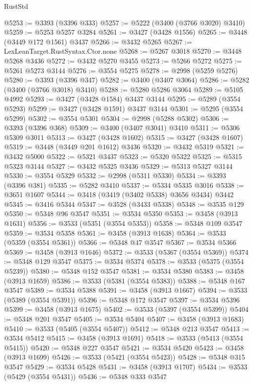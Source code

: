 \begin{lexlean}{RustStd}
\begin{coremodule}
@5253 := @3393 (@3396 @333)
@5257 := @5222 (@3400 (@3766 @3020) @3410)
@5259 := @5253 @5257 @3284
@5261 := @3427 (@3428 @1556)
@5265 := @3448 (@3449 @172 @1561) @3437
@5266 := @3432 @5265
@5267 := LexLeanTarget.RustSyntax.Ctor.none
@5268 := @5267 @3018
@5270 := @3448 @5268 @3436
@5272 := @3432 @5270 @3455
@5273 := @5266 @5272
@5275 := @5261 @5273 @3144
@5276 := @3554 @5275
@5278 := @2998 (@5259 @5276)
@5280 := @3393 (@3396 @347)
@5282 := @3400 (@3407 @3064)
@5286 := @5282 (@3400 (@3766 @3018) @3410)
@5288 := @5280 @5286 @3064
@5289 := @5105 @4992
@5293 := @3427 (@3428 @1584) @3437 @3144
@5295 := @5289 (@3554 @5293)
@5299 := @3427 (@3428 @1591) @3437 @3144
@5301 := @5295 (@3554 @5299)
@5302 := @3554 @5301
@5304 := @2998 (@5288 @5302)
@5306 := @3393 (@3396 @368)
@5309 := @3400 (@3407 @3041) @3410
@5311 := @5306 @5309 @3011
@5313 := @3427 (@3428 @1602)
@5315 := @3427 (@3428 @1607)
@5319 := @3448 (@3449 @201 @1612) @3436
@5320 := @3432 @5319
@5321 := @3432 @5000
@5322 := @5321 @3437
@5323 := @5320 @5322
@5325 := @5315 @5323 @3144
@5327 := @3432 @5325 @3436
@5329 := @5313 @5327 @3144
@5330 := @3554 @5329
@5332 := @2998 (@5311 @5330)
@5334 := @3393 (@3396 @381)
@5335 := @5282 @3410
@5337 := @5334 @5335 @3016
@5338 := @3651 @1607
@5344 := @3418 (@3419 (@3402 @5338) @3656 @3434) @3442
@5345 := @3416 @5344
@5347 := @3528 (@3433 @5338)
@5348 := @3535 @129
@5350 := @5348 @96 @3547
@5351 := @3534 @5350
@5353 := @3458 (@3913 @1631)
@5356 := @3533 (@5351 (@3554 @5353))
@5358 := @5348 @109 @3547
@5359 := @3534 @5358
@5361 := @3458 (@3913 @1638)
@5364 := @3533 (@5359 (@3554 @5361))
@5366 := @5348 @47 @3547
@5367 := @3534 @5366
@5369 := @3458 (@3913 @1646)
@5372 := @3533 (@5367 (@3554 @5369))
@5374 := @5348 @129 @3547
@5375 := @3534 @5374
@5378 := @3533 (@5375 (@3554 @5239))
@5380 := @5348 @152 @3547
@5381 := @3534 @5380
@5383 := @3458 (@3913 @1659)
@5386 := @3533 (@5381 (@3554 @5383))
@5388 := @5348 @167 @3547
@5389 := @3534 @5388
@5391 := @3458 (@3913 @1667)
@5394 := @3533 (@5389 (@3554 @5391))
@5396 := @5348 @172 @3547
@5397 := @3534 @5396
@5399 := @3458 (@3913 @1675)
@5402 := @3533 (@5397 (@3554 @5399))
@5404 := @5348 @201 @3547
@5405 := @3534 @5404
@5407 := @3458 (@3913 @1683)
@5410 := @3533 (@5405 (@3554 @5407))
@5412 := @5348 @213 @3547
@5413 := @3534 @5412
@5415 := @3458 (@3913 @1691)
@5418 := @3533 (@5413 (@3554 @5415))
@5420 := @5348 @227 @3547
@5421 := @3534 @5420
@5423 := @3458 (@3913 @1699)
@5426 := @3533 (@5421 (@3554 @5423))
@5428 := @5348 @315 @3547
@5429 := @3534 @5428
@5431 := @3458 (@3913 @1707)
@5434 := @3533 (@5429 (@3554 @5431))
@5436 := @5348 @333 @3547

\end{coremodule}
\end{lexlean}
